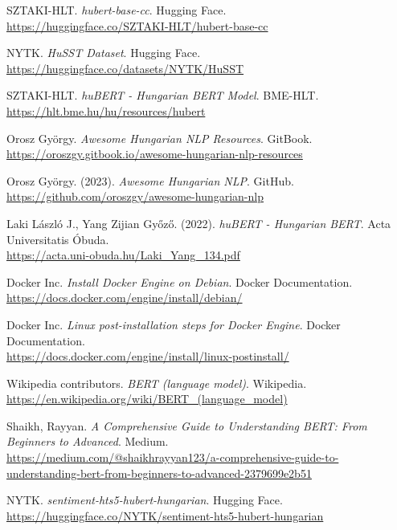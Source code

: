 \documentclass[12pt]{article}
\begin{document}
\begin{thebibliography}{9}

SZTAKI-HLT. \textit{hubert-base-cc}. Hugging Face. \\
\url{https://huggingface.co/SZTAKI-HLT/hubert-base-cc}

NYTK. \textit{HuSST Dataset}. Hugging Face. \\
\url{https://huggingface.co/datasets/NYTK/HuSST}

SZTAKI-HLT. \textit{huBERT - Hungarian BERT Model}. BME-HLT. \\
\url{https://hlt.bme.hu/hu/resources/hubert}

Orosz György. \textit{Awesome Hungarian NLP Resources}. GitBook. \\
\url{https://oroszgy.gitbook.io/awesome-hungarian-nlp-resources}

Orosz György. (2023). \textit{Awesome Hungarian NLP}. GitHub. \\
\url{https://github.com/oroszgy/awesome-hungarian-nlp}

Laki László J., Yang Zijian Győző. (2022). \textit{huBERT - Hungarian BERT}. Acta Universitatis Óbuda. \\
\url{https://acta.uni-obuda.hu/Laki_Yang_134.pdf}

Docker Inc. \textit{Install Docker Engine on Debian}. Docker Documentation. \\
\url{https://docs.docker.com/engine/install/debian/}

Docker Inc. \textit{Linux post-installation steps for Docker Engine}. Docker Documentation. \\
\url{https://docs.docker.com/engine/install/linux-postinstall/}

Wikipedia contributors. \textit{BERT (language model)}. Wikipedia. \\
\url{https://en.wikipedia.org/wiki/BERT_(language_model)}

Shaikh, Rayyan. \textit{A Comprehensive Guide to Understanding BERT: From Beginners to Advanced}. Medium. \\
\url{https://medium.com/@shaikhrayyan123/a-comprehensive-guide-to-understanding-bert-from-beginners-to-advanced-2379699e2b51}

NYTK. \textit{sentiment-hts5-hubert-hungarian}. Hugging Face. \\
\url{https://huggingface.co/NYTK/sentiment-hts5-hubert-hungarian}

\end{thebibliography}
\end{document}
